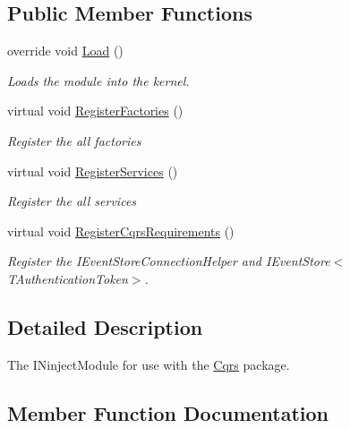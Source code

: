 \subsection*{Public Member Functions}
\begin{DoxyCompactItemize}
\item 
override void \hyperlink{classCqrs_1_1Ninject_1_1Configuration_1_1EventStoreModule_a90454d879b35a9d8954944e26c5afca9_a90454d879b35a9d8954944e26c5afca9}{Load} ()
\begin{DoxyCompactList}\small\item\em Loads the module into the kernel. \end{DoxyCompactList}\item 
virtual void \hyperlink{classCqrs_1_1Ninject_1_1Configuration_1_1EventStoreModule_a01ffbc5d28ee88168fc9058fcde6fff0_a01ffbc5d28ee88168fc9058fcde6fff0}{Register\+Factories} ()
\begin{DoxyCompactList}\small\item\em Register the all factories \end{DoxyCompactList}\item 
virtual void \hyperlink{classCqrs_1_1Ninject_1_1Configuration_1_1EventStoreModule_a72c71c7ccd12ca4ef434e3eea4dce7db_a72c71c7ccd12ca4ef434e3eea4dce7db}{Register\+Services} ()
\begin{DoxyCompactList}\small\item\em Register the all services \end{DoxyCompactList}\item 
virtual void \hyperlink{classCqrs_1_1Ninject_1_1Configuration_1_1EventStoreModule_a37ca0381038742667e7253f94e80e4b8_a37ca0381038742667e7253f94e80e4b8}{Register\+Cqrs\+Requirements} ()
\begin{DoxyCompactList}\small\item\em Register the I\+Event\+Store\+Connection\+Helper and I\+Event\+Store$<$\+T\+Authentication\+Token$>$. \end{DoxyCompactList}\end{DoxyCompactItemize}


\subsection{Detailed Description}
The I\+Ninject\+Module for use with the \hyperlink{namespaceCqrs}{Cqrs} package. 



\subsection{Member Function Documentation}
\mbox{\label{classCqrs_1_1Ninject_1_1Configuration_1_1EventStoreModule_a90454d879b35a9d8954944e26c5afca9_a90454d879b35a9d8954944e26c5afca9}} 
